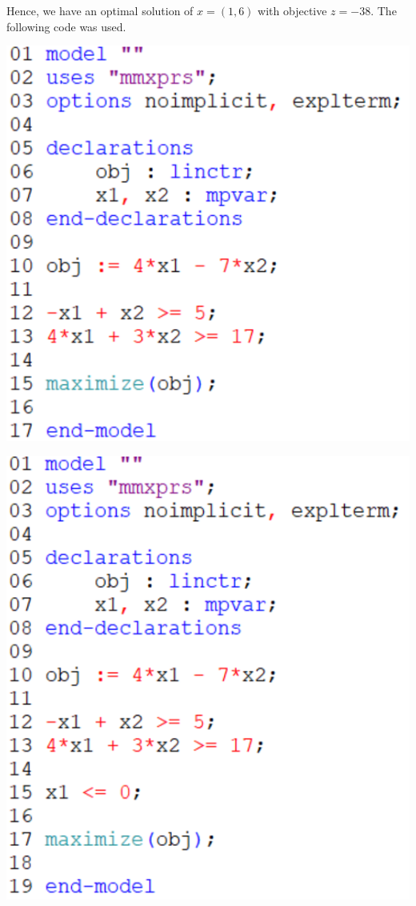 \documentclass[12pt]{article}
\theoremstyle{definition}
\begin{document}
\vspace{1em}
\vspace{1em}

Hence, we have an optimal solution of $x = (1, 6)$ with objective $z = -38$. The following code was used.
\begin{center}
    \begin{minipage}{0.3\textwidth}
        \includegraphics[width=\textwidth]{code2a.png}
    \end{minipage}
    \begin{minipage}{0.3\textwidth}
        \includegraphics[width=\textwidth]{code2b.png}

\end{minipage}
\end{center}
\end{document}
